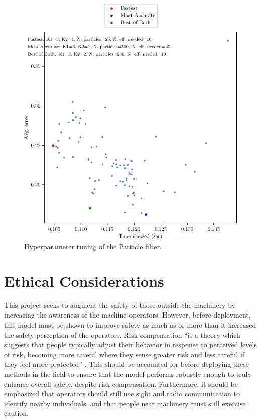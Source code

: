 \documentclass[11pt]{amsart}
\begin{document}
\begin{figure}[htp]
    \centering
    \includegraphics[width=1\textwidth]{actual_paper_graphs/gridsearch_particle_filter.pdf}\hfill
    \caption{Hyperparameter tuning of the Particle filter.}
    \label{fig:particle_hyperparam}
\end{figure}

\section{Ethical Considerations}
This project seeks to augment the safety of those outside the machinery by increasing the awareness of the machine operators. However, before deployment, this model must be 
shown to improve safety as much as or more than it increased the safety perception of the operators. Risk compensation “is a theory which suggests that people typically adjust 
their behavior in response to perceived levels of risk, becoming more careful where they sense greater risk and less careful if they feel more protected” \cite{Risk}. This should 
be accounted for before deploying these methods in the field to ensure that the model performs robustly enough to truly enhance overall safety, despite risk compensation. Furthermore, 
it should be emphasized that operators should still use sight and radio communication to identify nearby individuals, and that people near machinery must still exercise caution. 
\end{document}
